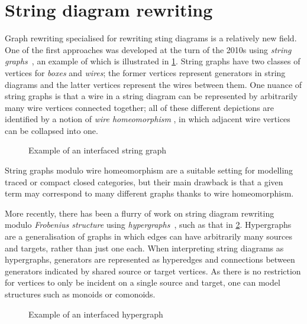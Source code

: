 \section{String diagram rewriting}

Graph rewriting specialised for rewriting sting diagrams is a
relatively new field.
One of the first approaches was developed at the turn of the 2010s using
\emph{string graphs}~\cite{%
    dixon2010open,dixon2013opengraphs,kissinger2012pictures%
},
an example of which is illustrated in \cref{fig:string-graph}.
String graphs have two classes of vertices for \emph{boxes} and \emph{wires}; the
former vertices represent generators in string diagrams and the latter vertices
represent the wires between them.
One nuance of string graphs is that a wire in a string diagram can be
represented by arbitrarily many wire vertices connected together; all of these
different depictions are identified by a notion of \emph{wire homeomorphism}
, in which adjacent wire vertices can be collapsed into
one.

\begin{figure}
    \centering
    \caption{Example of an interfaced string graph}
    \label{fig:string-graph}
\end{figure}

String graphs modulo wire homeomorphism are a suitable setting for modelling
traced or compact closed categories, but their main drawback is that a given
term may correspond to many different graphs thanks to wire homeomorphism.

More recently, there has been a flurry of work on string
diagram rewriting modulo \emph{Frobenius structure} using
\emph{hypergraphs}~\cite{%
    bonchi2016rewriting,zanasi2017rewriting,bonchi2017confluence,%
    bonchi2018rewriting,bonchi2022string,bonchi2022stringa,bonchi2022stringb%
}, such as that in \cref{fig:hypergraph-intro}.
Hypergraphs are a generalisation of graphs in which edges can have arbitrarily
many sources and targets, rather than just one each.
When interpreting string diagrams as hypergraphs, generators are represented as
hyperedges and connections between generators indicated by shared source or
target vertices.
As there is no restriction for vertices to only be incident on a single source and
target, one can model structures such as monoids or comonoids.

\begin{figure}
    \centering
    \caption{Example of an interfaced hypergraph}
    \label{fig:hypergraph-intro}
\end{figure}

